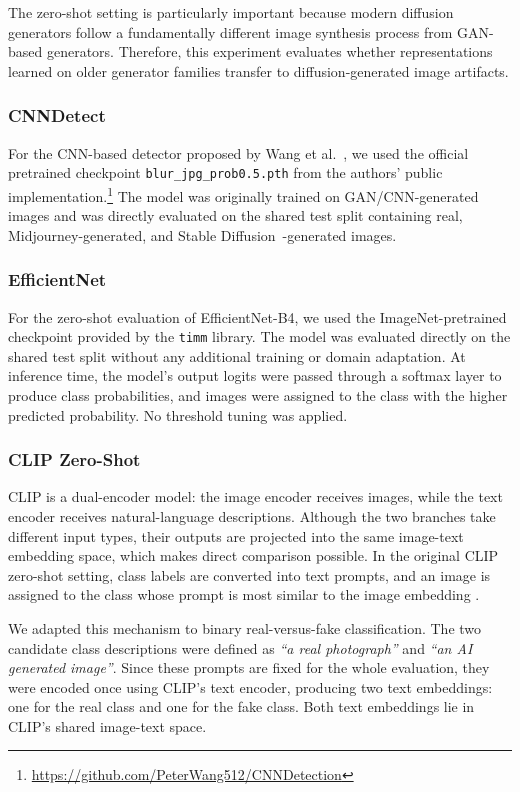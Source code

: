 The zero-shot setting is particularly important because modern diffusion generators follow a fundamentally different image synthesis process from GAN-based generators. Therefore, this experiment evaluates whether representations learned on older generator families transfer to diffusion-generated image artifacts.

\subsubsection{CNNDetect}
\label{subsubsec:cnndetect-zs}
For the CNN-based detector proposed by Wang et al.~\cite{wang2020cnndetect}, we used the official pretrained checkpoint \texttt{blur\_jpg\_prob0.5.pth} from the authors' public implementation.\footnote{\url{https://github.com/PeterWang512/CNNDetection}} The model was originally trained on GAN/CNN-generated images and was directly evaluated on the shared test split containing real, Midjourney-generated, and Stable Diffusion~\cite{rombach2022high}-generated images.

\subsubsection{EfficientNet}
\label{subsubsec:efficientnet-zs}
For the zero-shot evaluation of EfficientNet-B4, we used the ImageNet-pretrained checkpoint provided by the \texttt{timm} library. The model was evaluated directly on the shared test split without any additional training or domain adaptation. At inference time, the model's output logits were passed through a softmax layer to produce class probabilities, and images were assigned to the class with the higher predicted probability. No threshold tuning was applied.
\subsubsection{CLIP Zero-Shot}
\label{subsubsec:clip-zero-shot}

CLIP is a dual-encoder model: the image encoder receives images, while the text encoder receives natural-language descriptions. Although the two branches take different input types, their outputs are projected into the same image-text embedding space, which makes direct comparison possible. In the original CLIP zero-shot setting, class labels are converted into text prompts, and an image is assigned to the class whose prompt is most similar to the image embedding \cite{radford2021clip}.

We adapted this mechanism to binary real-versus-fake classification. The two candidate class descriptions were defined as \textit{``a real photograph''} and \textit{``an AI generated image''}. Since these prompts are fixed for the whole evaluation, they were encoded once using CLIP's text encoder, producing two text embeddings: one for the real class and one for the fake class. Both text embeddings lie in CLIP's shared image-text space.

